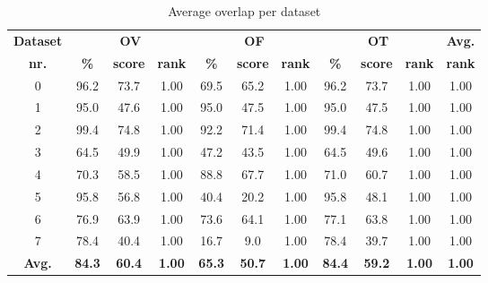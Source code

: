 \begin{table*}
\scriptsize
\caption{Average overlap per dataset}
\centering
\begin{tabular}{|c|ccc|ccc|ccc|c|}
\hline
\multicolumn{1}{|c|}{\textbf{Dataset}} &\multicolumn{3}{c|}{\textbf{OV}} &\multicolumn{3}{c|}{\textbf{OF}} &\multicolumn{3}{c|}{\textbf{OT}} &\multicolumn{1}{c|}{\textbf{Avg.}} \\
\multicolumn{1}{|c|}{\textbf{nr.}} &\multicolumn{1}{c|}{\textbf{\%}} &\multicolumn{1}{c|}{\textbf{score}} &\multicolumn{1}{c|}{\textbf{rank}} &\multicolumn{1}{c|}{\textbf{\%}} &\multicolumn{1}{c|}{\textbf{score}} &\multicolumn{1}{c|}{\textbf{rank}} &\multicolumn{1}{c|}{\textbf{\%}} &\multicolumn{1}{c|}{\textbf{score}} &\multicolumn{1}{c|}{\textbf{rank}} &\multicolumn{1}{c|}{\textbf{rank}}\\
\hline
0&96.2&73.7& 1.00&69.5&65.2& 1.00&96.2&73.7& 1.00& 1.00\\
1&95.0&47.6& 1.00&95.0&47.5& 1.00&95.0&47.5& 1.00& 1.00\\
2&99.4&74.8& 1.00&92.2&71.4& 1.00&99.4&74.8& 1.00& 1.00\\
3&64.5&49.9& 1.00&47.2&43.5& 1.00&64.5&49.6& 1.00& 1.00\\
4&70.3&58.5& 1.00&88.8&67.7& 1.00&71.0&60.7& 1.00& 1.00\\
5&95.8&56.8& 1.00&40.4&20.2& 1.00&95.8&48.1& 1.00& 1.00\\
6&76.9&63.9& 1.00&73.6&64.1& 1.00&77.1&63.8& 1.00& 1.00\\
7&78.4&40.4& 1.00&16.7&9.0& 1.00&78.4&39.7& 1.00& 1.00\\
\hline
\textbf{Avg.}&\textbf{84.3}&\textbf{60.4}&\textbf{ 1.00}&\textbf{65.3}&\textbf{50.7}&\textbf{ 1.00}&\textbf{84.4}&\textbf{59.2}&\textbf{ 1.00}&\textbf{ 1.00}\\
\hline
\end{tabular}
\vspace{-0.3cm}
\label{tb:tb_4_1}
\normalsize
\end{table*}

